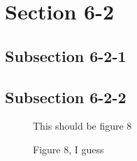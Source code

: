\documentclass[10pt]{book}
\begin{document}
\section{Section 6-2}
\label{sec:section-6-2}

\subsection{Subsection 6-2-1}
\label{sec:subsection-6-2-1}

\subsection{Subsection 6-2-2}
\label{sec:subsection-6-2-2}

\begin{figure}
  \centering
  This should be figure 8
  \caption{Figure 8, I guess}
  \label{fig:figure-8}
\end{figure}
\end{document}
